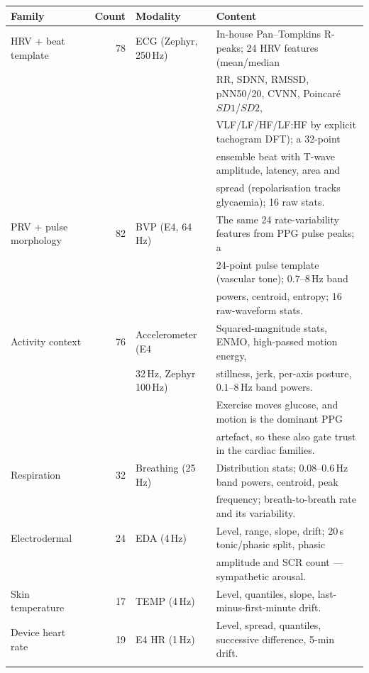 \documentclass[10pt,a4paper]{article}
\begin{document}
\begin{table}[h]
\centering\footnotesize
\begin{tabular}{@{}lrll@{}}
\toprule
\textbf{Family} & \textbf{Count} & \textbf{Modality} & \textbf{Content} \\
\midrule
HRV + beat template & 78 & ECG (Zephyr, 250\,Hz) &
  In-house Pan--Tompkins R-peaks; 24 HRV features (mean/median \\
 & & & RR, SDNN, RMSSD, pNN50/20, CVNN, Poincar\'e $SD1$/$SD2$, \\
 & & & VLF/LF/HF/LF:HF by explicit tachogram DFT); a 32-point \\
 & & & ensemble beat with T-wave amplitude, latency, area and \\
 & & & spread (repolarisation tracks glycaemia); 16 raw stats. \\
\addlinespace
PRV + pulse morphology & 82 & BVP (E4, 64\,Hz) &
  The same 24 rate-variability features from PPG pulse peaks; a \\
 & & & 24-point pulse template (vascular tone); $0.7$--$8$\,Hz band \\
 & & & powers, centroid, entropy; 16 raw-waveform stats. \\
\addlinespace
Activity context & 76 & Accelerometer (E4 &
  Squared-magnitude stats, ENMO, high-passed motion energy, \\
 & & 32\,Hz, Zephyr 100\,Hz) & stillness, jerk, per-axis posture, $0.1$--$8$\,Hz band powers. \\
 & & & Exercise moves glucose, and motion is the dominant PPG \\
 & & & artefact, so these also gate trust in the cardiac families. \\
\addlinespace
Respiration & 32 & Breathing (25\,Hz) &
  Distribution stats; $0.08$--$0.6$\,Hz band powers, centroid, peak \\
 & & & frequency; breath-to-breath rate and its variability. \\
\addlinespace
Electrodermal & 24 & EDA (4\,Hz) &
  Level, range, slope, drift; 20\,s tonic/phasic split, phasic \\
 & & & amplitude and SCR count --- sympathetic arousal. \\
\addlinespace
Skin temperature & 17 & TEMP (4\,Hz) &
  Level, quantiles, slope, last-minus-first-minute drift. \\
\addlinespace
Device heart rate & 19 & E4 HR (1\,Hz) &
  Level, spread, quantiles, successive difference, 5-min drift. \\
\addlinespace

\end{tabular}
\end{table}
\end{document}
